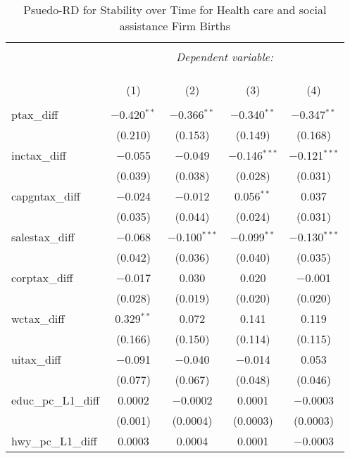 
\begin{table}[!htbp] \centering 
  \caption{Psuedo-RD for Stability over Time for  Health care and social assistance Firm Births} 
  \label{} 
\begin{tabular}{@{\extracolsep{5pt}}lcccc} 
\\[-1.8ex]\hline 
\hline \\[-1.8ex] 
 & \multicolumn{4}{c}{\textit{Dependent variable:}} \\ 
\cline{2-5} 
\\[-1.8ex] & \multicolumn{4}{c}{ } \\ 
\\[-1.8ex] & (1) & (2) & (3) & (4)\\ 
\hline \\[-1.8ex] 
 ptax\_diff & $-$0.420$^{**}$ & $-$0.366$^{**}$ & $-$0.340$^{**}$ & $-$0.347$^{**}$ \\ 
  & (0.210) & (0.153) & (0.149) & (0.168) \\ 
  inctax\_diff & $-$0.055 & $-$0.049 & $-$0.146$^{***}$ & $-$0.121$^{***}$ \\ 
  & (0.039) & (0.038) & (0.028) & (0.031) \\ 
  capgntax\_diff & $-$0.024 & $-$0.012 & 0.056$^{**}$ & 0.037 \\ 
  & (0.035) & (0.044) & (0.024) & (0.031) \\ 
  salestax\_diff & $-$0.068 & $-$0.100$^{***}$ & $-$0.099$^{**}$ & $-$0.130$^{***}$ \\ 
  & (0.042) & (0.036) & (0.040) & (0.035) \\ 
  corptax\_diff & $-$0.017 & 0.030 & 0.020 & $-$0.001 \\ 
  & (0.028) & (0.019) & (0.020) & (0.020) \\ 
  wctax\_diff & 0.329$^{**}$ & 0.072 & 0.141 & 0.119 \\ 
  & (0.166) & (0.150) & (0.114) & (0.115) \\ 
  uitax\_diff & $-$0.091 & $-$0.040 & $-$0.014 & 0.053 \\ 
  & (0.077) & (0.067) & (0.048) & (0.046) \\ 
  educ\_pc\_L1\_diff & 0.0002 & $-$0.0002 & 0.0001 & $-$0.0003 \\ 
  & (0.001) & (0.0004) & (0.0003) & (0.0003) \\ 
  hwy\_pc\_L1\_diff & 0.0003 & 0.0004 & 0.0001 & $-$0.0003 \\ 

\end{tabular}
\end{table}

